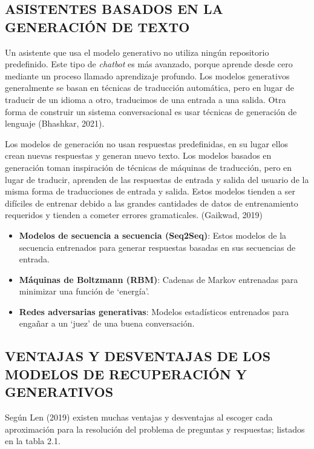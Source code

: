 \documentclass[letter, openright, 12pt]{book}
\begin{document}
\subsection{ASISTENTES BASADOS EN LA GENERACIÓN DE TEXTO}
Un asistente que usa el modelo generativo no utiliza ningún repositorio predefinido. Este tipo de \textit{chatbot} es más avanzado, porque aprende desde cero mediante un proceso llamado aprendizaje profundo. Los modelos generativos generalmente se basan en técnicas de traducción automática, pero en lugar de traducir de un idioma a otro, traducimos de una entrada a una salida. Otra forma de construir un sistema conversacional es usar técnicas de generación de lenguaje (Bhashkar, 2021).\par 
Los modelos de generación no usan respuestas predefinidas, en su lugar ellos crean nuevas respuestas y generan nuevo texto. Los modelos basados en generación toman inspiración de técnicas de máquinas de traducción, pero en lugar de traducir, aprenden de las respuestas de entrada y salida del usuario de la misma forma de traducciones de entrada y salida. Estos modelos tienden a ser difíciles de entrenar debido a las grandes cantidades de datos de entrenamiento requeridos y tienden a cometer errores gramaticales. (Gaikwad, 2019)

\begin{itemize}
\item \textbf{Modelos de secuencia a secuencia (Seq2Seq)}: Estos modelos de la secuencia entrenados para generar respuestas basadas en sus secuencias de entrada.
\item \textbf{Máquinas de Boltzmann (RBM)}: Cadenas de Markov entrenadas para minimizar una función de ‘energía’.
\item \textbf{Redes adversarias generativas}: Modelos estadísticos entrenados para engañar a un ‘juez’ de una buena conversación.
\end{itemize}

\subsection{VENTAJAS Y DESVENTAJAS DE LOS MODELOS DE RECUPERACIÓN Y GENERATIVOS}

Según Len (2019) existen muchas ventajas y desventajas al escoger cada aproximación para la resolución del problema de preguntas y respuestas; listados en la tabla 2.1.
\end{document}
